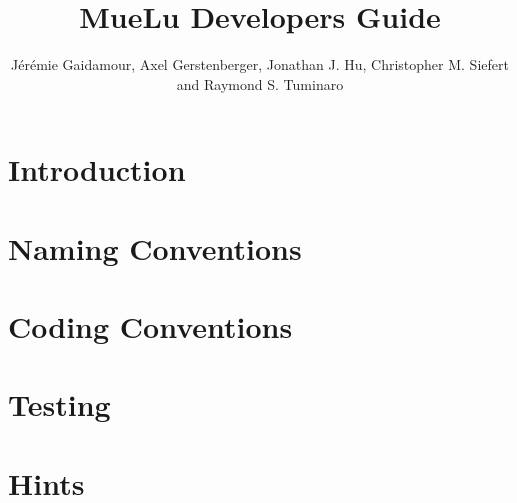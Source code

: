 \documentclass{article}
\title{MueLu Developers Guide}
\author{J\'er\'emie Gaidamour, Axel Gerstenberger, Jonathan J. Hu,
        Christopher M. Siefert and  Raymond S. Tuminaro}
\begin{document}

\maketitle

\begin{abstract}

\end{abstract}

\pagestyle{myheadings} \thispagestyle{plain} 

\section{Introduction}\label{sec:introduction}


\section{Naming Conventions}\label{sec:naming conventions}


\section{Coding Conventions}\label{sec:coding conventions}


\section{Testing}\label{sec:testing}


\section{Hints}\label{sec:hints}



 
\end{document}

